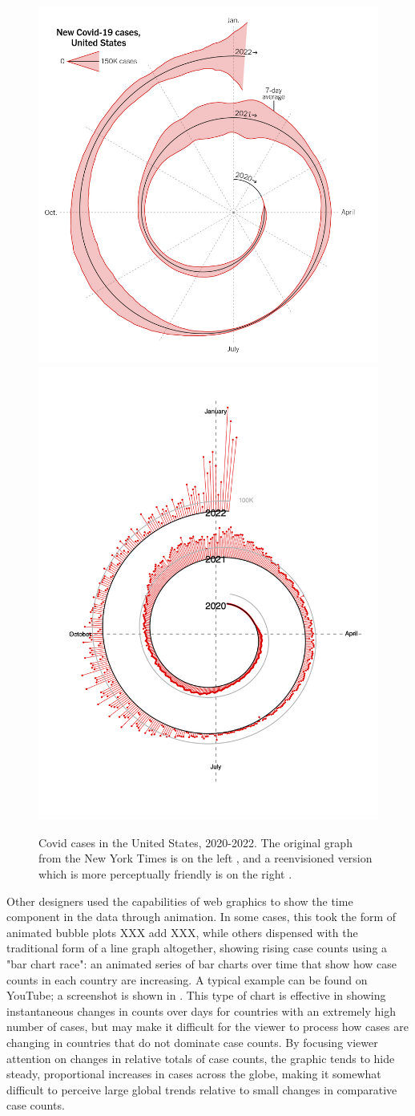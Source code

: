 \documentclass[article]{jdssv}\usepackage[]{graphicx}\usepackage[]{xcolor}
\begin{document}
\begin{figure}\centering
\includegraphics[width=.45\linewidth]{nyt-spiral}\hfill\includegraphics[width=.45\linewidth]{spiral-rework}
\caption{Covid cases in the United States, 2020-2022. The original graph from the New York Times is on the left \citep{shamanOpinionHereWhen2022}, and a reenvisioned version which is more perceptually friendly is on the right \citep{shresthaCovidSpiral2022}.}
\label{fig:nyt-spiral}
\end{figure}

Other designers used the capabilities of web graphics to show the time component in the data through animation. In some cases, this took the form of animated bubble plots XXX add XXX, while others dispensed with the traditional form of a line graph altogether, showing rising case counts using a "bar chart race": an animated series of bar charts over time that show how case counts in each country are increasing. A typical example can be found on YouTube\citep{clockCoronavirusCasesBar2022}; a screenshot is shown in . This type of chart is effective in showing instantaneous changes in counts over days for countries with an extremely high number of cases, but may make it difficult for the viewer to process how cases are changing in countries that do not dominate case counts. By focusing viewer attention on changes in relative totals of case counts, the graphic tends to hide steady, proportional increases in cases across the globe, making it somewhat difficult to perceive large global trends relative to small changes in comparative case counts. 
\end{document}
